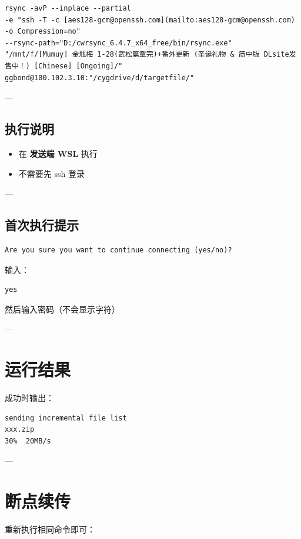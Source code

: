 \documentclass[UTF8]{ctexart}
\begin{document}
\begin{lstlisting}
rsync -avP --inplace --partial 
-e "ssh -T -c [aes128-gcm@openssh.com](mailto:aes128-gcm@openssh.com) -o Compression=no" 
--rsync-path="D:/cwrsync_6.4.7_x64_free/bin/rsync.exe" 
"/mnt/f/[Mumuy] 金瓶梅 1-28(武松篇章完)+番外更新 (圣诞礼物 & 简中版 DLsite发售中！) [Chinese] [Ongoing]/" 
ggbond@100.102.3.10:"/cygdrive/d/targetfile/"
\end{lstlisting}

---

\subsection{执行说明}

\begin{itemize}
\item 在 \textbf{发送端 WSL} 执行
\item 不需要先 ssh 登录
\end{itemize}

---

\subsection{首次执行提示}

\begin{lstlisting}
Are you sure you want to continue connecting (yes/no)?
\end{lstlisting}

输入：

\begin{lstlisting}
yes
\end{lstlisting}

然后输入密码（不会显示字符）

---

\section{运行结果}

成功时输出：

\begin{lstlisting}
sending incremental file list
xxx.zip
30%  20MB/s
\end{lstlisting}

---

\section{断点续传}

重新执行相同命令即可：
\end{document}
